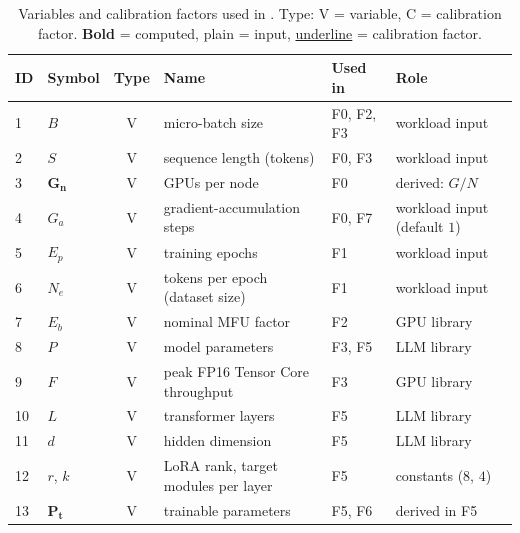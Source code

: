 \begin{table}[!h]
  \centering
  \caption{\footnotesize{Variables and calibration factors used in . Type: V = variable, C = calibration factor. \textbf{Bold} = computed,
  plain = input, \underline{underline} = calibration factor.}}
  \label{tab:kavier-variables}
  \renewcommand{\arraystretch}{1.15}
  \footnotesize
  \begin{tabular}{@{}l l c l l l@{}}
  \toprule
  \textbf{ID} & \textbf{Symbol} & \textbf{Type} & \textbf{Name} & \textbf{Used in} & \textbf{Role} \\
  \midrule
  1  & $B$            & V & micro-batch size                          & F0, F2, F3        & workload input \\
  2  & $S$            & V & sequence length (tokens)                  & F0, F3            & workload input \\
  3  & $\boldsymbol{G_n}$          & V & GPUs per node                             & F0                & derived: $G / N$ \\
  4  & $G_a$          & V & gradient-accumulation steps               & F0, F7            & workload input (default $1$) \\
  \midrule
  5  & $E_p$          & V & training epochs                           & F1                & workload input \\
  6  & $N_e$          & V & tokens per epoch (dataset size)           & F1                & workload input \\
  \midrule
  7  & $E_b$          & V & nominal MFU factor                        & F2                & GPU library \\
  \midrule
  8  & $P$            & V & model parameters                          & F3, F5            & LLM library \\
  9  & $F$            & V & peak FP16 Tensor Core throughput          & F3                & GPU library \\
  \midrule
  10 & $L$            & V & transformer layers                        & F5                & LLM library \\
  11 & $d$            & V & hidden dimension                          & F5                & LLM library \\
  12 & $r$, $k$       & V & LoRA rank, target modules per layer       & F5                & constants ($8$, $4$) \\
  13 & $\boldsymbol{P_t}$          & V & trainable parameters                      & F5, F6            & derived in F5 \\

\end{tabular}
\end{table}

